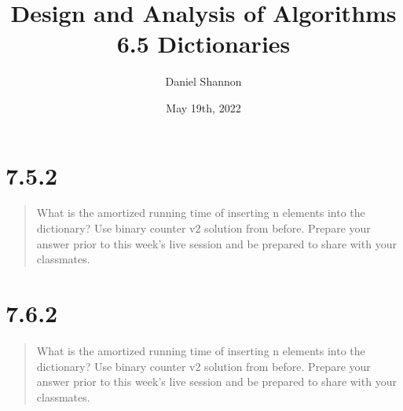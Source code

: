\documentclass[12pt, letterpaper, twoside]{article}
\title{%
Design and Analysis of Algorithms\\
\large 6.5 Dictionaries
}
\author{Daniel Shannon}
\date{May 19th, 2022}
\begin{document}
\begin{titlepage}
\maketitle
\end{titlepage}
\section*{7.5.2}
\begin{quote}
    What is the amortized running time of inserting n elements into the dictionary?
    Use binary counter v2 solution from before.
    Prepare your answer prior to this week's live session and be prepared to share with your classmates.
\end{quote}

\section*{7.6.2}
\begin{quote}
    What is the amortized running time of inserting n elements into the dictionary?
    Use binary counter v2 solution from before.
    Prepare your answer prior to this week's live session and be prepared to share with your classmates.
\end{quote}
\end{document}
